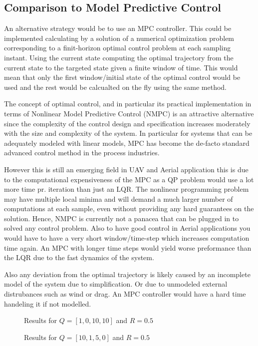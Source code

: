 \subsection{Comparison to Model Predictive Control}\label{sec:prob33}

An alternative strategy would be to use an MPC controller. This could be implemented calculating by a solution of a numerical optimization problem corresponding to a finit-horizon optimal control problem at each sampling instant. Using the current state computing the optimal trajectory from the current state to the targeted state given a finite window of time. This would mean that only the first window/initial state of the optimal control would be used and the rest would be calcualted on the fly using the same method.\citep{Johansen2011}

The concept of optimal control, and in particular its practical implementation in terms of Nonlinear Model Predictive Control (NMPC) is an attractive alternative since the complexity of the control design and specification increases moderately with the size and complexity of the system. In particular for systems that can be adequately modeled with linear models, MPC has become the de-facto standard advanced control method in the process industries.
\citep{Johansen2011}

However this is still an emerging field in UAV and Aerial application this is due to the computational expensiveness of the MPC as a QP problem would use a lot more time pr. iteration than just an LQR. The nonlinear programming problem may have multiple local minima and will demand a much larger number of computations at each sample, even without providing any hard guarantees on the solution. Hence, NMPC is currently not a panacea that can be plugged in to solved any control problem. Also to have good control in Aerial applications you would have to have a very short window/time-step which increases computation time again. An MPC with longer time steps would yield worse preformance than the LQR due to the fast dynamics of the system. \citep{Johansen2011}

Also any deviation from the optimal trajectory is likely caused by an incomplete model of the system due to simplification. Or due to unmodeled external distrubances such as wind or drag. An MPC controller would have a hard time handeling it if not modelled.


\begin{figure}[htbp]
	\centering
	\caption{Results for $Q=[1,0,10,10]$ and $R=0.5$}
	\label{fig:problem3_LQR[1,0,10,10]}
\end{figure}


\begin{figure}[htbp]
	\centering
	\caption{Results for $Q=[10,1,5,0]$ and $R=0.5$}
	\label{fig:problem3_LQR[10,1,5,0]}
\end{figure}

